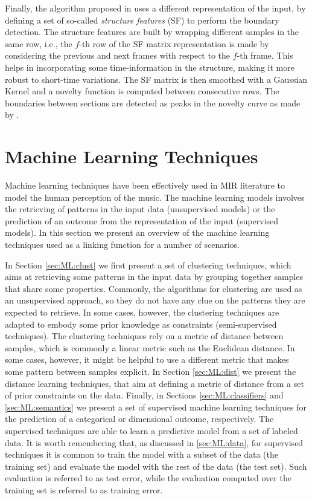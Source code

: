 Finally, the algorithm proposed in \cite{Serra2014} uses a different representation of the input, by defining a set of so-called \textit{structure features} (SF) to perform the boundary detection. The structure features are built by wrapping different samples in the same row, i.e., the $f$-th row of the SF matrix representation is made by considering the previous and next frames with respect to the $f$-th frame. This helps in incorporating some time-information in the structure, making it more robust to short-time variations. The SF matrix is then smoothed with a Gaussian Kernel and a novelty function is computed between consecutive rows. The boundaries between sections are detected as peaks in the novelty curve as made by \cite{foote2000automatic}.


\section{Machine Learning Techniques}\label{sec:ML:models}
Machine learning techniques have been effectively used in MIR literature to model the human perception of the music. The machine learning models involves the retrieving of patterns in the input data (unsupervised models) or the prediction of an outcome from the representation of the input (supervised models). In this section we present an overview of the machine learning techniques used as a linking function for a number of scenarios.

In Section \ref{sec:ML:clust} we first present a set of clustering techniques, which aims at retrieving some patterns in the input data by grouping together samples that share some properties. Commonly, the algorithms for clustering are used as an unsupervised approach, so they do not have any clue on the patterns they are expected to retrieve. In some cases, however, the clustering techniques are adapted to embody some prior knowledge as constraints (semi-supervised techniques). The clustering techniques rely on a metric of distance between samples, which is commonly a linear metric such as the Euclidean distance. In some cases, however, it might be helpful to use a different metric that makes some pattern between samples explicit. In Section \ref{sec:ML:dist} we present the distance learning techniques, that aim at defining a metric of distance from a set of prior constraints on the data. Finally, in Sections \ref{sec:ML:classifiers} and \ref{sec:ML:semantics} we present a set of supervised machine learning techniques for the prediction of a categorical or dimensional outcome, respectively. The supervised techniques are able to learn a predictive model from a set of labeled data. It is worth remembering that, as discussed in \ref{sec:ML:data}, for supervised techniques it is common to train the model with a subset of the data (the training set) and evaluate the model with the rest of the data (the test set). Such evaluation is referred to as test error, while the evaluation computed over the training set is referred to as training error. 

